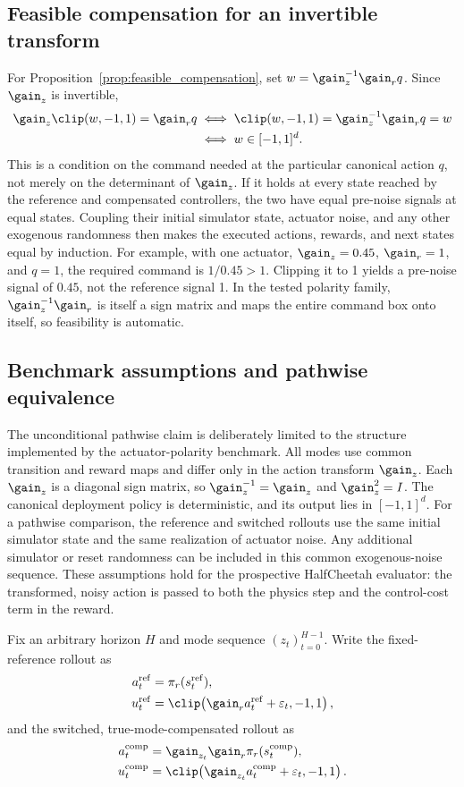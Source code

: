 \subsection{Feasible compensation for an invertible transform}

For Proposition~\ref{prop:feasible_compensation}, set $w=\gain_z^{-1}\gain_r q$. Since $\gain_z$ is invertible,
\begin{align}
 \gain_z\clip(w,-1,1)=\gain_r q
 &\iff \clip(w,-1,1)=\gain_z^{-1}\gain_r q=w\\
 &\iff w\in[-1,1]^d.
\end{align}
This is a condition on the command needed at the particular canonical action $q$, not merely on the determinant of $\gain_z$. If it holds at every state reached by the reference and compensated controllers, the two have equal pre-noise signals at equal states. Coupling their initial simulator state, actuator noise, and any other exogenous randomness then makes the executed actions, rewards, and next states equal by induction. For example, with one actuator, $\gain_z=0.45$, $\gain_r=1$, and $q=1$, the required command is $1/0.45>1$. Clipping it to 1 yields a pre-noise signal of $0.45$, not the reference signal 1. In the tested polarity family, $\gain_z^{-1}\gain_r$ is itself a sign matrix and maps the entire command box onto itself, so feasibility is automatic.

\subsection{Benchmark assumptions and pathwise equivalence}

The unconditional pathwise claim is deliberately limited to the structure implemented by the actuator-polarity benchmark. All modes use common transition and reward maps and differ only in the action transform $\gain_z$. Each $\gain_z$ is a diagonal sign matrix, so $\gain_z^{-1}=\gain_z$ and $\gain_z^2=I$. The canonical deployment policy is deterministic, and its output lies in $[-1,1]^d$. For a pathwise comparison, the reference and switched rollouts use the same initial simulator state and the same realization of actuator noise. Any additional simulator or reset randomness can be included in this common exogenous-noise sequence. These assumptions hold for the prospective HalfCheetah evaluator: the transformed, noisy action is passed to both the physics step and the control-cost term in the reward.

Fix an arbitrary horizon $H$ and mode sequence $(z_t)_{t=0}^{H-1}$. Write the fixed-reference rollout as
\begin{align}
    a_t^{\mathrm{ref}} &= \pi_r(s_t^{\mathrm{ref}}), \\
    u_t^{\mathrm{ref}} &= \clip\!\left(
        \gain_r a_t^{\mathrm{ref}}+\varepsilon_t,-1,1\right),
\end{align}
and the switched, true-mode-compensated rollout as
\begin{align}
    a_t^{\mathrm{comp}} &=
        \gain_{z_t}\gain_r\pi_r(s_t^{\mathrm{comp}}), \\
    u_t^{\mathrm{comp}} &= \clip\!\left(
        \gain_{z_t}a_t^{\mathrm{comp}}+\varepsilon_t,-1,1\right).
\end{align}

